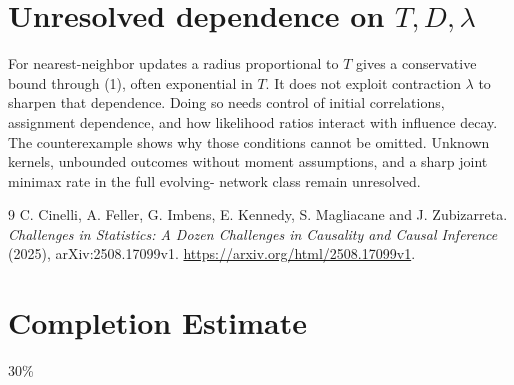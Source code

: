 \documentclass[11pt]{article}
\theoremstyle{definition}
\begin{document}
\section*{Unresolved dependence on $T,D,\lambda$}
For nearest-neighbor updates a radius proportional to $T$ gives a
conservative bound through (1), often exponential in $T$. It does not
exploit contraction $\lambda$ to sharpen that dependence. Doing so needs
control of initial correlations, assignment dependence, and how likelihood
ratios interact with influence decay. The counterexample shows why those
conditions cannot be omitted. Unknown kernels, unbounded outcomes without
moment assumptions, and a sharp joint minimax rate in the full evolving-
network class remain unresolved.

\begin{thebibliography}{9}
 C. Cinelli, A. Feller, G. Imbens, E. Kennedy, S. Magliacane and J. Zubizarreta.
\emph{Challenges in Statistics: A Dozen Challenges in Causality and Causal Inference} (2025), arXiv:2508.17099v1.
\url{https://arxiv.org/html/2508.17099v1}.
\end{thebibliography}
\section{Completion Estimate}
30\%
\end{document}
